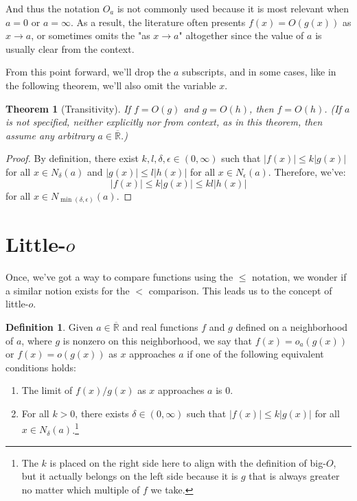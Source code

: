 \documentclass[9pt]{report}
\newtheorem{theorem}{Theorem}
\theoremstyle{definition}
\newtheorem{definition}{Definition}
\newcommand\RRE{\overline{\mathbb R}}
\newcommand\abs[1]{\left\lvert#1\right\rvert}
\begin{document}
And thus the notation \(O_a\) is not commonly used because it is most relevant when \(a = 0\) or \(a = \infty\). As a result, the literature often presents \(f(x) = O(g(x))\) as \(x \to a\), or sometimes omits the "as \(x \to a\)" altogether since the value of \(a\) is usually clear from the context.

From this point forward, we'll drop the \(a\) subscripts, and in some cases, like in the following theorem, we'll also omit the variable \(x\).

\begin{theorem}[Transitivity]
If \(f = O(g)\) and \(g = O(h)\), then \(f = O(h)\). (If \(a\) is not specified, neither explicitly nor from context, as in this theorem, then assume any arbitrary \(a \in \RRE\).)
\end{theorem}

\begin{proof}
By definition, there exist \(k, l, \delta, \epsilon \in (0, \infty)\) such that \(\abs{f(x)} \leq k \abs{g(x)}\) for all \(x \in N_{\delta}(a)\) and \(\abs{g(x)} \leq l \abs{h(x)}\) for all \(x \in N_{\epsilon}(a)\). Therefore, we've:
\[\abs{f(x)} \leq k \abs{g(x)} \leq kl \abs{h(x)}\]
for all \(x \in N_{\min(\delta, \epsilon)}(a)\).
\end{proof}


\section{Little-$o$}\label{ssec:littleo}

Once, we've got a way to compare functions using the \(\leq\) notation, we wonder if a similar notion exists for the \(<\) comparison. This leads us to the concept of little-\(o\).

\begin{definition}
Given \(a \in \RRE\) and real functions \(f\) and \(g\) defined on a neighborhood of \(a\), where \(g\) is nonzero on this neighborhood, we say that \(f(x) = o_a(g(x))\) or \(f(x) = o(g(x))\) as \(x\) approaches \(a\) if one of the following equivalent conditions holds:
\begin{enumerate}
    \item The limit of \(f(x)/g(x)\) as \(x\) approaches \(a\) is \(0\).
    \item For all \(k > 0\), there exists \(\delta \in (0, \infty)\) such that \(\abs{f(x)} \leq k\abs{g(x)}\) for all \(x \in N_{\delta}(a)\).\footnote{The \(k\) is placed on the right side here to align with the definition of big-$O$, but it actually belongs on the left side because it is \(g\) that is always greater no matter which multiple of \(f\) we take.}
\end{enumerate}
\end{definition}
\end{document}
